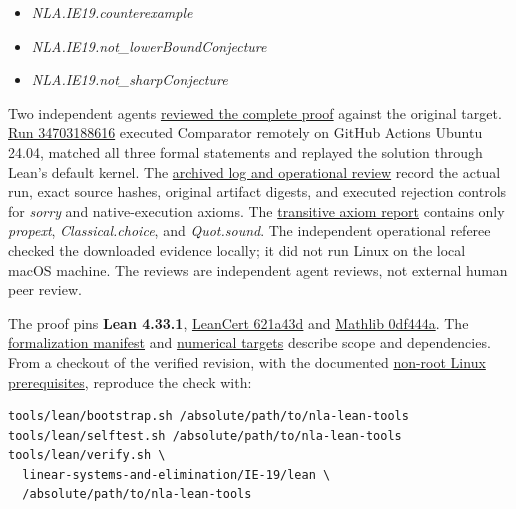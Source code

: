 \documentclass[11pt,a4paper]{article}
\providecommand{\tightlist}{\setlength{\itemsep}{0pt}\setlength{\parskip}{0pt}}
\begin{document}
\begin{itemize}
\tightlist
\item
  \textit{NLA.IE19.counterexample}
\item
  \textit{NLA.IE19.not\_lowerBoundConjecture}
\item
  \textit{NLA.IE19.not\_sharpConjecture}
\end{itemize}

Two independent agents
\href{https://github.com/ajt60gaibb/OpenProblemsInNLA/blob/main/linear-systems-and-elimination/IE-19/lean/reviews}{reviewed
the complete proof} against the original target.
\href{https://github.com/sgstepaniants/OpenProblemsInNLA/actions/runs/34703188616}{Run
34703188616} executed Comparator remotely on GitHub Actions Ubuntu
24.04, matched all three formal statements and replayed the solution
through Lean's default kernel. The
\href{https://github.com/ajt60gaibb/OpenProblemsInNLA/blob/main/linear-systems-and-elimination/IE-19/lean/verification/linux-2026-09-12}{archived
log and operational review} record the actual run, exact source hashes,
original artifact digests, and executed rejection controls for
\textit{sorry} and native-execution axioms. The
\href{https://github.com/ajt60gaibb/OpenProblemsInNLA/blob/main/linear-systems-and-elimination/IE-19/lean/verification/axioms.log}{transitive
axiom report} contains only \textit{propext}, \textit{Classical.choice},
and \textit{Quot.sound}. The independent operational referee checked the
downloaded evidence locally; it did not run Linux on the local macOS
machine. The reviews are independent agent reviews, not external human
peer review.

The proof pins \textbf{Lean 4.33.1},
\href{https://github.com/alerad/leancert/tree/621a43d7cf21f87872392a01e874f2f1dbddc926}{LeanCert
621a43d} and
\href{https://github.com/leanprover-community/mathlib4/tree/0df444a360eaa60ab8c11dca51a86af692955474}{Mathlib
0df444a}. The
\href{https://github.com/ajt60gaibb/OpenProblemsInNLA/blob/main/linear-systems-and-elimination/IE-19/lean/formalization.yaml}{formalization
manifest} and
\href{https://github.com/ajt60gaibb/OpenProblemsInNLA/blob/main/linear-systems-and-elimination/IE-19/lean/NUMERICAL_TARGETS.md}{numerical
targets} describe scope and dependencies. From a checkout of the
verified revision, with the documented
\href{https://github.com/ajt60gaibb/OpenProblemsInNLA/blob/main/tools/lean/HARNESS.md}{non-root
Linux prerequisites}, reproduce the check with:

\begin{verbatim}
tools/lean/bootstrap.sh /absolute/path/to/nla-lean-tools
tools/lean/selftest.sh /absolute/path/to/nla-lean-tools
tools/lean/verify.sh \
  linear-systems-and-elimination/IE-19/lean \
  /absolute/path/to/nla-lean-tools
\end{verbatim}
\end{document}
